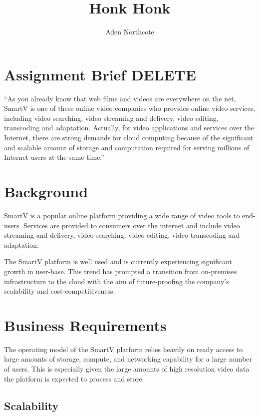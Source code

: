 \documentclass[]{article}
\title{Honk Honk}
\author{Aden Northcote}
\date{}
\begin{document}
    
\maketitle

\tableofcontents

\clearpage

\section{Assignment Brief DELETE}
``As you already know that web films and videos are everywhere on the net, SmartV is one of these online
video companies who provides online video services, including video searching, video streaming and
delivery, video editing, transcoding and adaptation. Actually, for video applications and services over the Internet, there are strong demands for cloud computing because of the significant and scalable amount of storage and computation required for serving millions of Internet users at the same time.''

\section{Background}

SmartV is a popular online platform providing a wide range of video tools to end-users. Services are provided to consumers over the internet and include video streaming and delivery, video searching, video editing, video transcoding and adaptation.

The SmartV platform is well used and is currently experiencing significant growth in user-base. This trend has prompted a transition from on-premises infrastructure to the cloud with the aim of future-proofing the company's scalability and cost-competitiveness.

\section{Business Requirements}

The operating model of the SmartV platform relies heavily on ready access to large amounts of storage, compute, and networking capability for a large number of users. This is especially given the large amounts of high resolution video data the platform is expected to process and store.

\subsection{Scalability}
\end{document}
